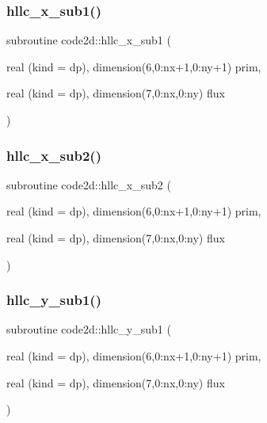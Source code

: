 \mbox{\label{main2Dv1_8f90_ad651365c868e762b033239f23065b179}} 
\subsubsection{\texorpdfstring{hllc\+\_\+x\+\_\+sub1()}{hllc\_x\_sub1()}}
{\footnotesize\ttfamily subroutine code2d\+::hllc\+\_\+x\+\_\+sub1 (\begin{DoxyParamCaption}\item[{real (kind = dp), dimension(6,0\+:nx+1,0\+:ny+1)}]{prim,  }\item[{real (kind = dp), dimension(7,0\+:nx,0\+:ny)}]{flux }\end{DoxyParamCaption})}

\mbox{\label{main2Dv1_8f90_a542b368221e3c5b6eed538ddc6538ca5}} 
\subsubsection{\texorpdfstring{hllc\+\_\+x\+\_\+sub2()}{hllc\_x\_sub2()}}
{\footnotesize\ttfamily subroutine code2d\+::hllc\+\_\+x\+\_\+sub2 (\begin{DoxyParamCaption}\item[{real (kind = dp), dimension(6,0\+:nx+1,0\+:ny+1)}]{prim,  }\item[{real (kind = dp), dimension(7,0\+:nx,0\+:ny)}]{flux }\end{DoxyParamCaption})}

\mbox{\label{main2Dv1_8f90_a3abf545225182ebde80c72121d2de6f2}} 
\subsubsection{\texorpdfstring{hllc\+\_\+y\+\_\+sub1()}{hllc\_y\_sub1()}}
{\footnotesize\ttfamily subroutine code2d\+::hllc\+\_\+y\+\_\+sub1 (\begin{DoxyParamCaption}\item[{real (kind = dp), dimension(6,0\+:nx+1,0\+:ny+1)}]{prim,  }\item[{real (kind = dp), dimension(7,0\+:nx,0\+:ny)}]{flux }\end{DoxyParamCaption})}

